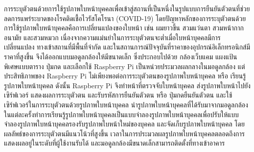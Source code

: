 \maketitle
\makesignature

\ifproject
\begin{abstractTH}


การระบุตัวตนด้วยการใช้รูปภาพใบหน้าบุคคลเพื่อเข้าสู่สถานที่เป็นหนึ่งในรูปแบบการยืนยันตัวตนที่ช่วยลดการแพร่ระบาดของโรคติดเชื้อไวรัสโคโรนา (COVID-19) โดยปัญหาหลักของการระบุตัวตนด้วยการใช้รูปภาพใบหน้าบุคคลคือการเปลี่ยนแปลงของใบหน้า 
เช่น ผมยาวขึ้น สวมแว่นตา สวมหน้ากากอนามัย และสวมหมวก เนื่องจากความแม่นยำในการระบุตัวตนจะต่ำเมื่อใบหน้าบุคคลมีการเปลี่ยนแปลง ทางเข้าสถานที่มีพื้นที่จำกัด และในสถานการณ์ปัจจุบันที่ราคาของอุปกรณ์อิเล็กทรอนิกส์มีราคาที่สูงขึ้น 
จึงได้ออกแบบมอดูลกล้องให้มีขนาดเล็ก ซึ่งประกอบไปด้วย กล้องเว็บแคม แผงแป้นพิเศษแบบตาราง ปุ่มกด และเลือกใช้ Raspberry Pi เป็นหน่วยประมวลผลกลางในมอดูลกล้อง แต่ประสิทธิภาพของ Raspberry Pi ไม่เพียงพอต่อการระบุตัวตนของรูปภาพใบหน้าบุคคล 
หรือ เรียนรู้รูปภาพใบหน้าบุคคล ดังนั้น Raspberry Pi จึงทำหน้าที่ตรวจจับใบหน้าบุคคล ส่งรูปภาพใบหน้าไปยังเซิร์ฟเวอร์ แสดงผลการระบุตัวตน และรับรหัสการยืนยันตัวตน หรือ ปุ่มกดยืนยันตัวตน และใช้เซิร์ฟเวอร์ในการระบุตัวตนด้วยรูปภาพใบหน้าบุคคล 
นำรูปภาพใบหน้าบุคคลที่ได้รับมาจากมอดูลกล้องในแต่ละครั้งทำการเรียนรู้รูปภาพใบหน้าบุคคลเป็นแบบจำลองรูปภาพใบหน้าบุคคลเพื่อปรับให้แบบจำลองรูปภาพใบหน้าบุคคลรองรับรูปภาพใบหน้าใหม่ของบุคคล และจัดเก็บรูปภาพใบหน้าบุคคล
โดยผลลัพธ์ของการระบุตัวตนมีแนวโน้วที่สูงขึ้น เวลาในการประมวลผลรูปภาพใบหน้าบุคคลตลอดถึงการแสดงผลอยู่ในระดับที่ผู้ใช้งานรับได้ และมอดูลกล้องมีขนาดเล็กสามารถติดตั้งที่ทางเข้าอาคาร




\end{abstractTH}
